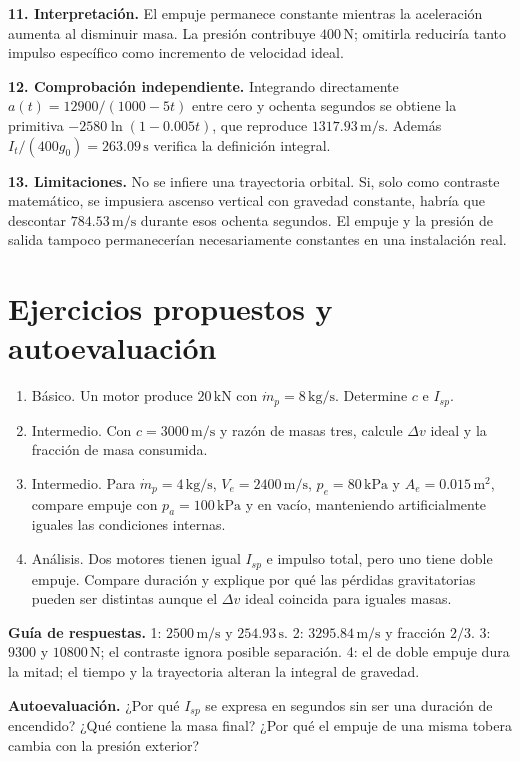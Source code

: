 \textbf{11. Interpretación.} El empuje permanece constante mientras la aceleración aumenta al disminuir masa. La presión contribuye $400\,\mathrm{N}$; omitirla reduciría tanto impulso específico como incremento de velocidad ideal.

\textbf{12. Comprobación independiente.} Integrando directamente $a(t)=12900/(1000-5t)$ entre cero y ochenta segundos se obtiene la primitiva $-2580\ln(1-0.005t)$, que reproduce $1317.93\,\mathrm{m/s}$. Además $I_t/(400g_0)=263.09\,\mathrm{s}$ verifica la definición integral.

\textbf{13. Limitaciones.} No se infiere una trayectoria orbital. Si, solo como contraste matemático, se impusiera ascenso vertical con gravedad constante, habría que descontar $784.53\,\mathrm{m/s}$ durante esos ochenta segundos. El empuje y la presión de salida tampoco permanecerían necesariamente constantes en una instalación real.

\section{Ejercicios propuestos y autoevaluación}
\begin{enumerate}
\item Básico. Un motor produce $20\,\mathrm{kN}$ con $\dot m_p=8\,\mathrm{kg/s}$. Determine $c$ e $I_{sp}$.
\item Intermedio. Con $c=3000\,\mathrm{m/s}$ y razón de masas tres, calcule $\Delta v$ ideal y la fracción de masa consumida.
\item Intermedio. Para $\dot m_p=4\,\mathrm{kg/s}$, $V_e=2400\,\mathrm{m/s}$, $p_e=80\,\mathrm{kPa}$ y $A_e=0.015\,\mathrm{m^2}$, compare empuje con $p_a=100\,\mathrm{kPa}$ y en vacío, manteniendo artificialmente iguales las condiciones internas.
\item Análisis. Dos motores tienen igual $I_{sp}$ e impulso total, pero uno tiene doble empuje. Compare duración y explique por qué las pérdidas gravitatorias pueden ser distintas aunque el $\Delta v$ ideal coincida para iguales masas.
\end{enumerate}
\textbf{Guía de respuestas.} 1: $2500\,\mathrm{m/s}$ y $254.93\,\mathrm{s}$. 2: $3295.84\,\mathrm{m/s}$ y fracción $2/3$. 3: $9300$ y $10800\,\mathrm{N}$; el contraste ignora posible separación. 4: el de doble empuje dura la mitad; el tiempo y la trayectoria alteran la integral de gravedad.

\textbf{Autoevaluación.} ¿Por qué $I_{sp}$ se expresa en segundos sin ser una duración de encendido? ¿Qué contiene la masa final? ¿Por qué el empuje de una misma tobera cambia con la presión exterior?
